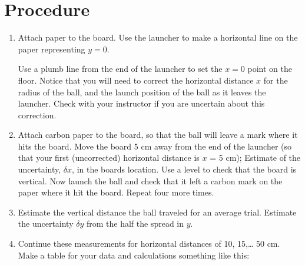 \section*{Procedure}
\begin{enumerate}

\item Attach paper to the board.  Use the launcher to make a horizontal line
on the paper representing $y = 0$.

Use a plumb line from the end of the launcher to set the $x = 0$ point on the
floor.  Notice that you will need to correct the horizontal distance $x$ for
the radius of the ball, and the launch position of the ball as it leaves the
launcher.  Check with your instructor if you are uncertain about this correction.  


\item  Attach carbon paper to the board, so that the ball will leave a mark where
it hits the board. 
Move the board 5 cm away from the end of the launcher (so that your first (uncorrected) 
horizontal distance is $x$ = 5 cm);
Estimate of the
uncertainty, $\delta x$, in the boards location. Use a level to check that the board is vertical. 
Now launch the ball and check that it
left a carbon mark on the paper where it hit the board.  Repeat four more times. 

\item  Estimate the vertical distance
the ball traveled for an average trial.  Estimate the uncertainty $\delta y$ from the
half the spread in $y$.

\item  Continue these measurements for horizontal distances of 10, 15,\ldots
50 cm.  Make a table for your data and calculations something like this:


\end{enumerate}

